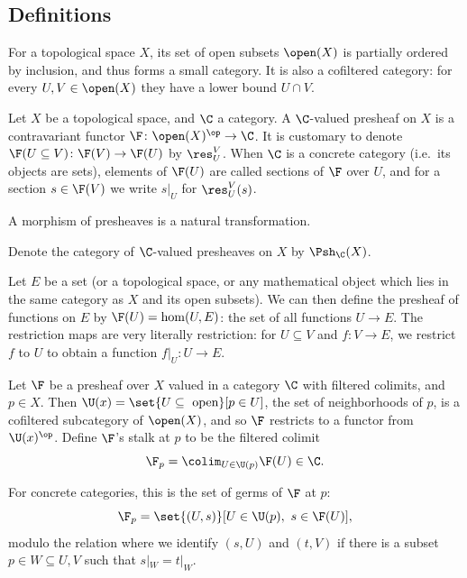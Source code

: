\subsection{Definitions}

\bdefn

    For a topological space $X$, its set of open subsets $\open(X)$ is partially ordered by inclusion, and thus forms a small category.
    It is also a cofiltered category: for every $U,V\in\open(X)$ they have a lower bound $U\cap V$.

\edefn

\bdefn

    Let $X$ be a topological space, and $\C$ a category.
    A {\emphcolor $\C$-valued presheaf on $X$} is a contravariant functor $\F\colon\open(X)^\op\to\C$.
    It is customary to denote $\F(U\subseteq V)\colon\F(V)\to\F(U)$ by $\res^V_U$.
    When $\C$ is a concrete category (i.e.\ its objects are sets), elements of $\F(U)$ are called {\emphcolor sections of $\F$ over $U$},
    and for a section $s\in\F(V)$ we write $s|_U$ for $\res^V_U(s)$.

    A {\emphcolor morphism of presheaves} is a natural transformation.

    Denote the category of $\C$-valued presheaves on $X$ by $\Psh_\C(X)$.

\edefn

\bexam

    Let $E$ be a set (or a topological space, or any mathematical object which lies in the same category as $X$ and its open subsets).
    We can then define the presheaf of functions on $E$ by $\F(U)=\hom(U,E)$: the set of all functions $U\to E$.
    The restriction maps are very literally restriction: for $U\subseteq V$ and $f\colon V\to E$, we restrict $f$ to $U$ to obtain a function
    $f|_U\colon U\to E$.

\eexam

\bdefn

    Let $\F$ be a presheaf over $X$ valued in a category $\C$ with filtered colimits, and $p\in X$.
    Then $\U(x)=\set{U\subseteq\hbox{ open}}[p\in U]$, the set of neighborhoods of $p$, is a cofiltered subcategory of $\open(X)$, and so $\F$
    restricts to a functor from $\U(x)^\op$.
    Define $\F$'s {\emphcolor stalk} at $p$ to be the filtered colimit
    $$ \F_p = \colim_{U\in\U(p)}\F(U) \in \C . $$

    For concrete categories, this is the set of {\emphcolor germs} of $\F$ at $p$:
    $$ \F_p = \set{(U,s)}[U\in\U(p),\ s\in\F(U)] , $$
    modulo the relation where we identify $(s,U)$ and $(t,V)$ if there is a subset $p\in W\subseteq U,V$ such that $s|_W=t|_W$.

